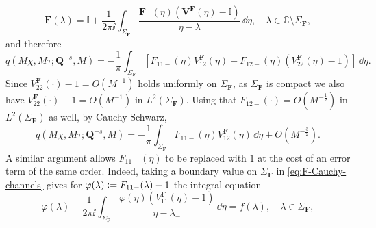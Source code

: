 \begin{equation}
\mathbf{F}(\lambda)=\mathbb{I}+\frac{1}{2\pi\ii}\int_{\Sigma_\mathbf{F}}\frac{\mathbf{F}_-(\eta)(\mathbf{V}^\mathbf{F}(\eta)-\mathbb{I})}{\eta-\lambda}\,\dd\eta,\quad
\lambda\in\mathbb{C}\setminus\Sigma_\mathbf{F},
\label{eq:F-Cauchy-channels}
\end{equation}
and therefore
\begin{equation}
q(M\chi,M\tau;\mathbf{Q}^{-s},M)=-\frac{1}{\pi}\int_{\Sigma_\mathbf{F}}\left[F_{11-}(\eta)V^\mathbf{F}_{12}(\eta)+F_{12-}(\eta)(V^\mathbf{F}_{22}(\eta)-1)\right]\,\dd\eta.
\end{equation}
Since 
$V^\mathbf{F}_{22}(\cdot)-1=O(M^{-1})$
holds uniformly on $\Sigma_\mathbf{F}$, as $\Sigma_\mathbf{F}$ is compact we also have 
$V^\mathbf{F}_{22}(\cdot)-1=O(M^{-1})$
in $L^2(\Sigma_\mathbf{F})$.  Using that 
$F_{12-}(\cdot)=O(M^{-\frac{1}{2}})$
in $L^2(\Sigma_\mathbf{F})$ as well, by Cauchy-Schwarz,
\begin{equation}
q(M\chi,M\tau;\mathbf{Q}^{-s},M)=-\frac{1}{\pi}\int_{\Sigma_\mathbf{F}}F_{11-}(\eta)V^\mathbf{F}_{12}(\eta)\,\dd\eta + O(M^{-\frac{3}{2}}).
\end{equation}
A similar argument allows $F_{11-}(\eta)$ to be replaced with $1$ at the cost of an error term of the same order.  Indeed, taking a boundary value on $\Sigma_\mathbf{F}$ in \eqref{eq:F-Cauchy-channels} gives for $\varphi(\lambda)\vcentcolon= F_{11-}(\lambda)-1$ the integral equation
\begin{equation}
\varphi(\lambda)-\frac{1}{2\pi\ii}\int_{\Sigma_\mathbf{F}}\frac{\varphi(\eta)(V^\mathbf{F}_{11}(\eta)-1)}{\eta-\lambda_-}\,\dd\eta = f(\lambda),\quad\lambda\in\Sigma_\mathbf{F},
\label{eq:phi-integral-equation}
\end{equation}
